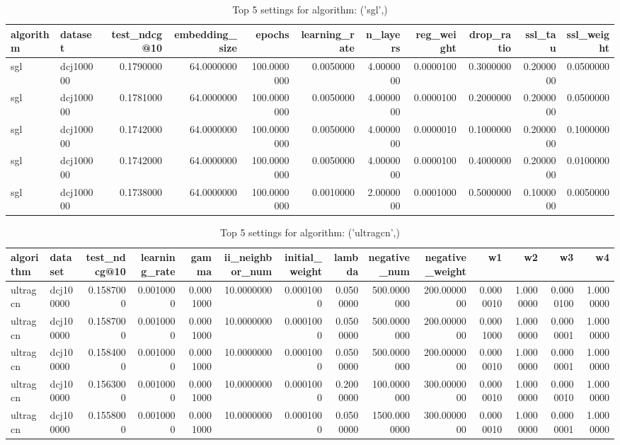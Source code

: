 \begin{table}
\caption{Top 5 settings for algorithm: ('sgl',)}
\label{tab:('sgl',)_top5}
\begin{tabular}{llrrrrrrrrr}
\toprule
algorithm & dataset & test_ndcg@10 & embedding_size & epochs & learning_rate & n_layers & reg_weight & drop_ratio & ssl_tau & ssl_weight \\
\midrule
sgl & dcj100000 & 0.1790000 & 64.0000000 & 100.0000000 & 0.0050000 & 4.0000000 & 0.0000100 & 0.3000000 & 0.2000000 & 0.0500000 \\
sgl & dcj100000 & 0.1781000 & 64.0000000 & 100.0000000 & 0.0050000 & 4.0000000 & 0.0000100 & 0.2000000 & 0.2000000 & 0.0500000 \\
sgl & dcj100000 & 0.1742000 & 64.0000000 & 100.0000000 & 0.0050000 & 4.0000000 & 0.0000010 & 0.1000000 & 0.2000000 & 0.1000000 \\
sgl & dcj100000 & 0.1742000 & 64.0000000 & 100.0000000 & 0.0050000 & 4.0000000 & 0.0000100 & 0.4000000 & 0.2000000 & 0.0100000 \\
sgl & dcj100000 & 0.1738000 & 64.0000000 & 100.0000000 & 0.0010000 & 2.0000000 & 0.0001000 & 0.5000000 & 0.1000000 & 0.0050000 \\
\bottomrule
\end{tabular}
\end{table}


\begin{table}
\caption{Top 5 settings for algorithm: ('ultragcn',)}
\label{tab:('ultragcn',)_top5}
\begin{tabular}{llrrrrrrrrrrrr}
\toprule
algorithm & dataset & test_ndcg@10 & learning_rate & gamma & ii_neighbor_num & initial_weight & lambda & negative_num & negative_weight & w1 & w2 & w3 & w4 \\
\midrule
ultragcn & dcj100000 & 0.1587000 & 0.0010000 & 0.0001000 & 10.0000000 & 0.0001000 & 0.0500000 & 500.0000000 & 200.0000000 & 0.0000010 & 1.0000000 & 0.0000100 & 1.0000000 \\
ultragcn & dcj100000 & 0.1587000 & 0.0010000 & 0.0001000 & 10.0000000 & 0.0001000 & 0.0500000 & 500.0000000 & 200.0000000 & 0.0001000 & 1.0000000 & 0.0000001 & 1.0000000 \\
ultragcn & dcj100000 & 0.1584000 & 0.0010000 & 0.0001000 & 10.0000000 & 0.0001000 & 0.0500000 & 500.0000000 & 200.0000000 & 0.0000010 & 1.0000000 & 0.0000001 & 1.0000000 \\
ultragcn & dcj100000 & 0.1563000 & 0.0010000 & 0.0001000 & 10.0000000 & 0.0001000 & 0.2000000 & 100.0000000 & 300.0000000 & 0.0000010 & 1.0000000 & 0.0000010 & 1.0000000 \\
ultragcn & dcj100000 & 0.1558000 & 0.0010000 & 0.0001000 & 10.0000000 & 0.0001000 & 0.0500000 & 1500.0000000 & 300.0000000 & 0.0000010 & 1.0000000 & 0.0000001 & 1.0000000 \\
\bottomrule
\end{tabular}
\end{table}


